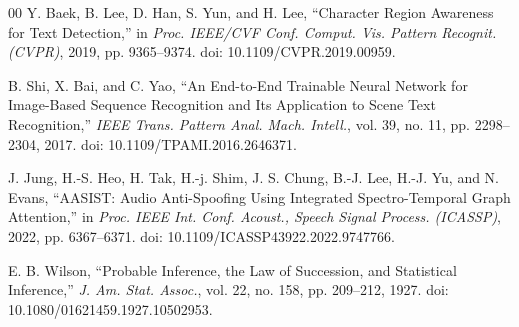 \documentclass[conference]{IEEEtran}
\begin{document}
\begin{thebibliography}{00}
Y. Baek, B. Lee, D. Han, S. Yun, and H. Lee, ``Character Region Awareness for Text Detection,'' in \textit{Proc. IEEE/CVF Conf. Comput. Vis. Pattern Recognit. (CVPR)}, 2019, pp. 9365--9374. doi: 10.1109/CVPR.2019.00959.

B. Shi, X. Bai, and C. Yao, ``An End-to-End Trainable Neural Network for Image-Based Sequence Recognition and Its Application to Scene Text Recognition,'' \textit{IEEE Trans. Pattern Anal. Mach. Intell.}, vol. 39, no. 11, pp. 2298--2304, 2017. doi: 10.1109/TPAMI.2016.2646371.

J. Jung, H.-S. Heo, H. Tak, H.-j. Shim, J. S. Chung, B.-J. Lee, H.-J. Yu, and N. Evans, ``AASIST: Audio Anti-Spoofing Using Integrated Spectro-Temporal Graph Attention,'' in \textit{Proc. IEEE Int. Conf. Acoust., Speech Signal Process. (ICASSP)}, 2022, pp. 6367--6371. doi: 10.1109/ICASSP43922.2022.9747766.

E. B. Wilson, ``Probable Inference, the Law of Succession, and Statistical Inference,'' \textit{J. Am. Stat. Assoc.}, vol. 22, no. 158, pp. 209--212, 1927. doi: 10.1080/01621459.1927.10502953.

\end{thebibliography}
\end{document}
